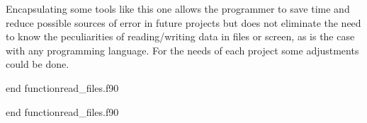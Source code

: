 Encapsulating some tools like this one allows the programmer to save time and reduce possible sources of error in future projects but does not eliminate the need to know the peculiarities of reading/writing data in files or screen, as is the case with any programming language. For the needs of each project some adjustments could be done.

\vspace{0.5cm} 
{end function}{read_files.f90}

{end function}{read_files.f90}

  
  
  
  
 
 
 
 
 
 
 
 
 
 
 
 
 
 
